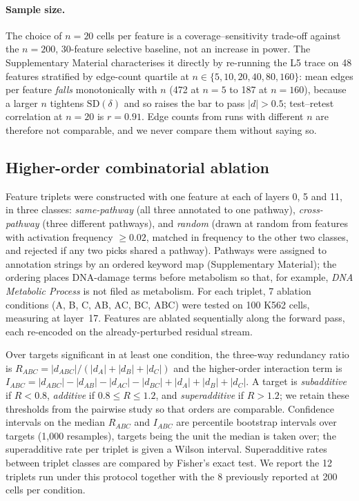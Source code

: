 \documentclass[11pt,onecolumn]{article}
\begin{document}
\paragraph{Sample size.}
The choice of $n=20$ cells per feature is a coverage--sensitivity trade-off against the $n=200$, 30-feature selective baseline, not an increase in power. The Supplementary Material characterises it directly by re-running the L5 trace on 48 features stratified by edge-count quartile at $n\in\{5,10,20,40,80,160\}$: mean edges per feature \emph{falls} monotonically with $n$ (472 at $n=5$ to 187 at $n=160$), because a larger $n$ tightens $\mathrm{SD}(\delta)$ and so raises the bar to pass $|d|>0.5$; test--retest correlation at $n=20$ is $r=0.91$. Edge counts from runs with different $n$ are therefore not comparable, and we never compare them without saying so.

\subsection{Higher-order combinatorial ablation}

Feature triplets were constructed with one feature at each of layers 0, 5 and 11, in three classes: \emph{same-pathway} (all three annotated to one pathway), \emph{cross-pathway} (three different pathways), and \emph{random} (drawn at random from features with activation frequency $\geq 0.02$, matched in frequency to the other two classes, and rejected if any two picks shared a pathway). Pathways were assigned to annotation strings by an ordered keyword map (Supplementary Material); the ordering places DNA-damage terms before metabolism so that, for example, \emph{DNA Metabolic Process} is not filed as metabolism. For each triplet, 7 ablation conditions (A, B, C, AB, AC, BC, ABC) were tested on 100 K562 cells, measuring at layer~17. Features are ablated sequentially along the forward pass, each re-encoded on the already-perturbed residual stream.

Over targets significant in at least one condition, the three-way redundancy ratio is $R_{ABC}=|d_{ABC}|/(|d_A|+|d_B|+|d_C|)$ and the higher-order interaction term is $I_{ABC}=|d_{ABC}|-|d_{AB}|-|d_{AC}|-|d_{BC}|+|d_A|+|d_B|+|d_C|$. A target is \emph{subadditive} if $R<0.8$, \emph{additive} if $0.8\leq R\leq 1.2$, and \emph{superadditive} if $R>1.2$; we retain these thresholds from the pairwise study so that orders are comparable. Confidence intervals on the median $R_{ABC}$ and $I_{ABC}$ are percentile bootstrap intervals over targets (1{,}000 resamples), targets being the unit the median is taken over; the superadditive rate per triplet is given a Wilson interval. Superadditive rates between triplet classes are compared by Fisher's exact test. We report the 12 triplets run under this protocol together with the 8 previously reported at 200 cells per condition.
\end{document}
